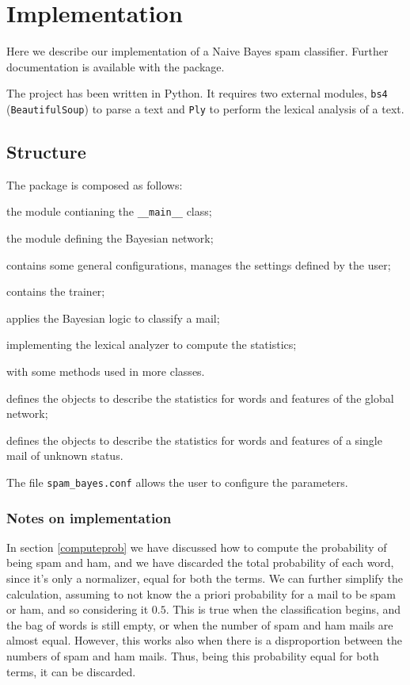 \section{Implementation}
Here we describe our implementation of a Naive Bayes spam classifier. Further documentation is available with the package.

The project has been written in Python. It requires two external modules, \verb!bs4! (\verb!BeautifulSoup!) to parse a text and \verb!Ply! to perform the lexical analysis of a text.

\subsection{Structure}
The package is composed as follows:
\begin{description}[noitemsep]
  \item[spam\_bayes] the module contianing the \verb!__main__! class;
  \item[naive\_bayes] the module defining the Bayesian network;
  \item[config] contains some general configurations, manages the settings defined by the user;
  \item[trainer] contains the trainer;
  \item[classifier] applies the Bayesian logic to classify a mail;
  \item[lexer] implementing the lexical analyzer to compute the statistics;
  \item[utils] with some methods used in more classes.
  \item[gen\_stat] defines the objects to describe the statistics for words and features of the global network;
  \item[test\_stat] defines the objects to describe the statistics for words and features of a single mail of unknown status.
\end{description}
The file \verb!spam_bayes.conf! allows the user to configure the parameters.

\subsubsection{Notes on implementation}
In section \ref{computeprob} we have discussed how to compute the probability of being spam and ham, and we have discarded the total probability of each word, since it's only a normalizer, equal for both the terms. We can further simplify the calculation, assuming to not know the a priori probability for a mail to be spam or ham, and so considering it $0.5$. This is true when the classification begins, and the bag of words is still empty, or when the number of spam and ham mails are almost equal. However, this works also when there is a disproportion between the numbers of spam and ham mails. Thus, being this probability equal for both terms, it can be discarded.

